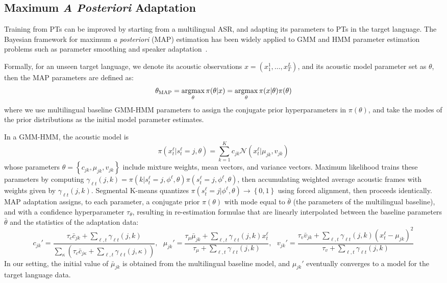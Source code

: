 \subsection{Maximum {\em A Posteriori} Adaptation}
\label{sec:adaptation}

Training from PTs can be improved by starting from a multilingual ASR,
and adapting its parameters to PTs in the target language.  The
Bayesian framework for maximum {\em a posteriori} (MAP) estimation
has been widely applied to GMM and HMM parameter estimation problems
such as parameter smoothing and speaker
adaptation~\cite{gauvain1994maximum}.

Formally, for an unseen target language, we denote its acoustic
observations $x = ( x_1^1, \ldots, x_{T}^L )$, and its acoustic model
parameter set as $\theta$, then the MAP parameters are defined as:
\begin{equation}
  \theta_{\mathrm{MAP}}  = \argmax_{\theta} \pi(\theta | x) 
= \argmax_{\theta} \pi( x | \theta ) \pi(\theta)
\label{eq:map}
\end{equation}
\noindent where we use multilingual baseline GMM-HMM parameters to
assign the conjugate prior hyperparameters in $\pi(\theta)$, and
take the modes of the prior distributions as the initial model
parameter estimates.

In a GMM-HMM, the acoustic model is
\[
\pi(x_t^\ell|s_t^\ell =j,\theta )=
\sum_{k=1}^K c_{jk}
\mathcal{N}
\left(x_t^\ell|\mu_{jk},v_{jk}
\right)
\]
\noindent
whose parameters $\theta=\left\{c_{jk},\mu_{jk},v_{jk}\right\}$
include mixture weights, mean vectors, and variance vectors.  Maximum
likelihood trains these parameters by computing $\gamma_{\ell
  t}(j,k)=\pi(k|s_t^\ell =j,\phi^\ell,\theta)\pi(s_t^\ell
=j,\phi^\ell,\theta)$, then accumulating weighted average acoustic
frames with weights given by $\gamma_{\ell t}(j,k)$. Segmental K-means
quantizes $\pi(s_t^\ell
=j|\phi^\ell,\theta)\rightarrow\left\{0,1\right\}$ using forced
alignment, then proceeds identically.  MAP adaptation assigns, to each
parameter, a conjugate prior $\pi(\theta)$ with mode equal to
$\bar\theta$ (the parameters of the multilingual baseline), and with a
confidence hyperparameter $\tau_\theta$, resulting in re-estimation
formulae that are linearly interpolated between the baseline
parameters $\bar\theta$ and the statistics of the adaptation data:
\[
c_{jk}'=\frac{\tau_c\bar{c}_{jk}+\sum_{\ell,t}\gamma_{\ell t}(j,k)}
{\sum_{\kappa}\left(\tau_c\bar{c}_{j\kappa}+
  \sum_{\ell,t}\gamma_{\ell t}(j,\kappa)\right)},~~~
\mu_{jk}'=\frac{\tau_\mu\bar{\mu}_{jk}+\sum_{\ell,t}\gamma_{\ell t}(j,k)x_t^\ell}
   {\tau_\mu+\sum_{\ell,t}\gamma_{\ell t}(j,k)},~~~
v_{jk}'=\frac{\tau_v\bar{v}_{jk}+\sum_{\ell,t}\gamma_{\ell t}(j,k)(x_t^\ell-\mu_{jk})^2}
{\tau_v+\sum_{\ell,t}\gamma_{\ell t}(j,k)}
\]
In our setting, the initial value of $\bar{\mu}_{jk}$ is obtained from
the multilingual baseline model, and $\mu_{jk}'$ eventually converges
to a model for the target language data.


